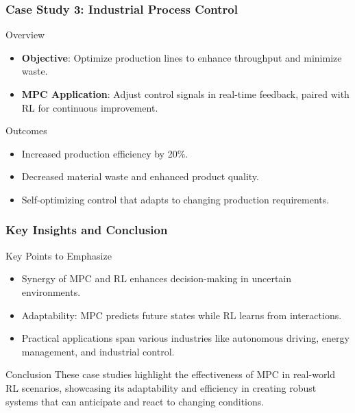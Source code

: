 \documentclass[aspectratio=169]{beamer}
\begin{document}
\begin{frame}[fragile]
    \frametitle{Case Study 3: Industrial Process Control}
    \begin{block}{Overview}
        \begin{itemize}
            \item \textbf{Objective}: Optimize production lines to enhance throughput and minimize waste.
            \item \textbf{MPC Application}: Adjust control signals in real-time feedback, paired with RL for continuous improvement.
        \end{itemize}
    \end{block}
    \begin{block}{Outcomes}
        \begin{itemize}
            \item Increased production efficiency by 20\%.
            \item Decreased material waste and enhanced product quality.
            \item Self-optimizing control that adapts to changing production requirements.
        \end{itemize}
    \end{block}
\end{frame}

\begin{frame}[fragile]
    \frametitle{Key Insights and Conclusion}
    \begin{block}{Key Points to Emphasize}
        \begin{itemize}
            \item Synergy of MPC and RL enhances decision-making in uncertain environments.
            \item Adaptability: MPC predicts future states while RL learns from interactions.
            \item Practical applications span various industries like autonomous driving, energy management, and industrial control.
        \end{itemize}
    \end{block}
    \begin{block}{Conclusion}
        These case studies highlight the effectiveness of MPC in real-world RL scenarios, showcasing its adaptability and efficiency in creating robust systems that can anticipate and react to changing conditions.
    \end{block}
\end{frame}
\end{document}
